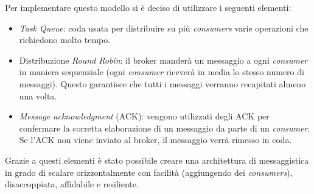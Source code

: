 Per implementare questo modello si è deciso di utilizzare i seguenti elementi:
\begin{itemize}
    \itemsep0em
    \item \textit{Task Queue}: coda usata per distribuire su più \textit{consumers} varie operazioni che richiedono molto tempo.
    \item Distribuzione \textit{Round Robin}: il broker manderà un messaggio a ogni \textit{consumer} in maniera sequenziale (ogni \textit{consumer} riceverà in media lo stesso numero di messaggi). Questo garantisce che tutti i messaggi verranno recapitati almeno una volta.
    \item \textit{Message acknowledgment} (ACK): vengono utilizzati degli ACK per confermare la corretta elaborazione di un messaggio da parte di un \textit{consumer}. Se l'ACK non viene inviato al broker, il messaggio verrà rimesso in coda.
\end{itemize}
Grazie a questi elementi è stato possibile creare una architettura di messaggistica in grado di scalare orizzontalmente con facilità (aggiungendo dei \textit{consumers}), disaccoppiata, affidabile e resiliente.



